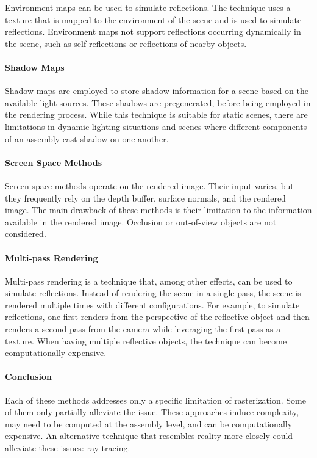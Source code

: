 Environment maps can be used to simulate reflections. The technique uses a texture that is mapped to the environment of the scene and is used to simulate reflections. Environment maps not support reflections occurring dynamically in the scene, such as self-reflections or reflections of nearby objects.

\paragraph{Shadow Maps}

Shadow maps are employed to store shadow information for a scene based on the available light sources. These shadows are pregenerated, before being employed in the rendering process. While this technique is suitable for static scenes, there are limitations in dynamic lighting situations and scenes where different components of an assembly cast shadow on one another.

\paragraph{Screen Space Methods}

Screen space methods operate on the rendered image. Their input varies, but they frequently rely on the depth buffer, surface normals, and the rendered image. The main drawback of these methods is their limitation to the information available in the rendered image. Occlusion or out-of-view objects are not considered.

\paragraph{Multi-pass Rendering}

Multi-pass rendering is a technique that, among other effects, can be used to simulate reflections. Instead of rendering the scene in a single pass, the scene is rendered multiple times with different configurations. For example, to simulate reflections, one first renders from the perspective of the reflective object and then renders a second pass from the camera while leveraging the first pass as a texture. When having multiple reflective objects, the technique can become computationally expensive.

\paragraph{Conclusion}

Each of these methods addresses only a specific limitation of rasterization. Some of them only partially alleviate the issue. These approaches induce complexity, may need to be computed at the assembly level, and can be computationally expensive. An alternative technique that resembles reality more closely could alleviate these issues: ray tracing.

